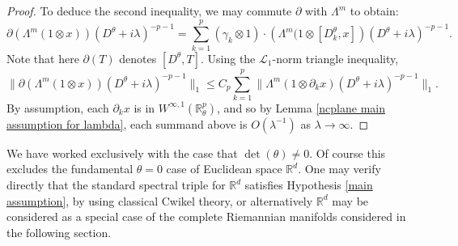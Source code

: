 \begin{proof}
        To deduce the second inequality, we may commute $\partial$ with $\Lambda^{m}$ to obtain:
        \begin{equation*}
            \partial(\Lambda^m(1\otimes x))(D^\theta+i\lambda)^{-p-1} = \sum_{k=1}^p \left(\gamma_k\otimes 1\right)\cdot\left(\Lambda^m(1\otimes [D_k^\theta,x]\right)(D^\theta+i\lambda)^{-p-1}.
        \end{equation*}
        Note that here $\partial(T)$ denotes $[D^\theta,T]$. Using the $\mathcal{L}_1$-norm triangle inequality,
        \begin{equation*}
            \|\partial(\Lambda^m(1\otimes x))(D^\theta+i\lambda)^{-p-1}\|_1 \leq C_p\sum_{k=1}^p \|\Lambda^m(1\otimes \partial_k x)(D^\theta+i\lambda)^{-p-1}\|_1.
        \end{equation*}
        By assumption, each $\partial_k x$ is in $W^{\infty,1}(\mathbb{R}^p_\theta)$, and so by Lemma \ref{ncplane main assumption for lambda}, each summand above is $O(\lambda^{-1})$
        as $\lambda \to \infty$.
    \end{proof}
    
    \begin{rem}
        We have worked exclusively with the case that $\det(\theta) \neq 0$. Of course this excludes the fundamental $\theta = 0$ case of Euclidean space $\mathbb{R}^d$. One
        may verify directly that the standard spectral triple for $\mathbb{R}^d$ satisfies Hypothesis \ref{main assumption}, by using classical Cwikel theory, or alternatively
        $\mathbb{R}^d$ may be considered as a special case of the complete Riemannian manifolds considered in the following section.
    \end{rem}

